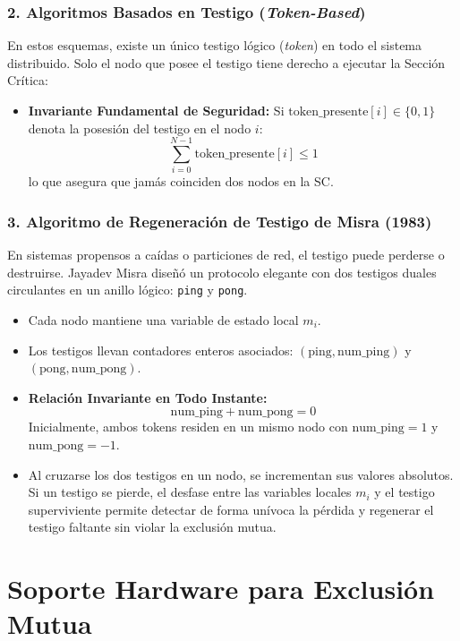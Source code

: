 \subsubsection{2. Algoritmos Basados en Testigo (\textit{Token-Based})}
En estos esquemas, existe un único testigo lógico (\textit{token}) en todo el sistema distribuido. Solo el nodo que posee el testigo tiene derecho a ejecutar la Sección Crítica:
\begin{itemize}[leftmargin=*]
    \item \textbf{Invariante Fundamental de Seguridad:} Si $\text{token\_presente}[i] \in \{0, 1\}$ denota la posesión del testigo en el nodo $i$:
    \[
    \sum_{i=0}^{N-1} \text{token\_presente}[i] \le 1
    \]
    lo que asegura que jamás coinciden dos nodos en la SC.
\end{itemize}

\subsubsection{3. Algoritmo de Regeneración de Testigo de Misra (1983)}
En sistemas propensos a caídas o particiones de red, el testigo puede perderse o destruirse. Jayadev Misra diseñó un protocolo elegante con dos testigos duales circulantes en un anillo lógico: \texttt{ping} y \texttt{pong}.
\begin{itemize}[leftmargin=*]
    \item Cada nodo mantiene una variable de estado local $m_i$.
    \item Los testigos llevan contadores enteros asociados: $(\text{ping}, \text{num\_ping})$ y $(\text{pong}, \text{num\_pong})$.
    \item \textbf{Relación Invariante en Todo Instante:}
    \[
    \text{num\_ping} + \text{num\_pong} = 0
    \]
    Inicialmente, ambos tokens residen en un mismo nodo con $\text{num\_ping} = 1$ y $\text{num\_pong} = -1$.
    \item Al cruzarse los dos testigos en un nodo, se incrementan sus valores absolutos. Si un testigo se pierde, el desfase entre las variables locales $m_i$ y el testigo superviviente permite detectar de forma unívoca la pérdida y regenerar el testigo faltante sin violar la exclusión mutua.
\end{itemize}

\section{Soporte Hardware para Exclusión Mutua}

